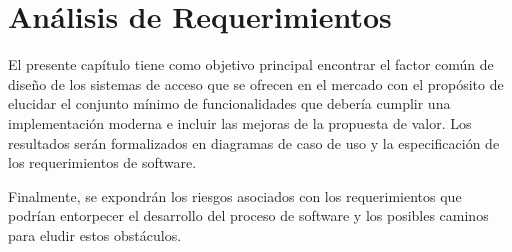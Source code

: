 
\chapter{Análisis de Requerimientos} %

\label{Chapter3} %



El presente capítulo tiene como objetivo principal encontrar el factor común de diseño
de los sistemas de acceso que se ofrecen en el mercado con el propósito de elucidar el conjunto mínimo de funcionalidades que debería cumplir una implementación moderna e incluir 
las mejoras de la propuesta de valor. Los resultados serán formalizados en diagramas de caso de uso y la especificación de los requerimientos de software.

Finalmente, se expondrán los riesgos asociados con los requerimientos que podrían entorpecer el desarrollo del proceso de software y los posibles caminos para eludir estos obstáculos.
\\

